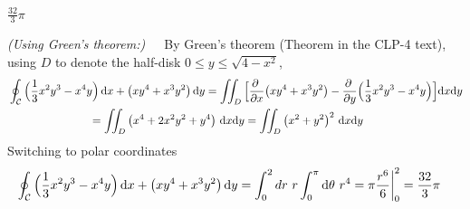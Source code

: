 \begin{answer} 
$\frac{32}{3}\pi$
\end{answer}

\begin{solution} 
\emph{(Using Green's theorem:)}\ \ \ 
By Green's theorem  (Theorem  in the CLP-4 text), 
using $D$ to
denote the half-disk $0\le y\le \sqrt{4-x^2}$,
\begin{align*}
&\dst\oint_{\cC} \Big(\frac{1}{3}x^2y^3-x^4y\Big)\,\dee{x}
+\big(xy^4+x^3y^2\big)\,\dee{y}
=\dblInt_D\Big[\pdiff{}{x}\big(xy^4+x^3y^2\big)
-\pdiff{}{y}\Big(\frac{1}{3}x^2y^3-x^4y\Big) \Big] \dee{x} \dee{y}\\
&\hskip1in=\dblInt_D\big(x^4+2x^2y^2+y^4\big)\ \dee{x} \dee{y}
=\dblInt_D\big(x^2+y^2\big)^2\ \dee{x} \dee{y}
\end{align*}
Switching to polar coordinates
\begin{align*}
\displaystyle\oint_{\mathcal{C}} \Big(\frac{1}{3}x^2y^3-x^4y\Big)\,\mathrm{d}x
+\big(xy^4+x^3y^2\big)\,\mathrm{d}y
&=\int_0^2 dr\ r\int_0^{\pi}\mathrm{d}\theta\ r^4
={\pi\frac{r^6}{6}\bigg|}_0^2
=\frac{32}{3}\pi
\end{align*}


\end{solution}
